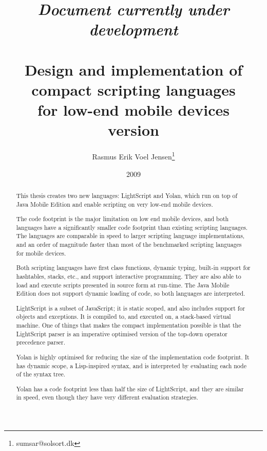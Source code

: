 \documentclass[11pt]{report}
\title{
\emph{Document currently under development} \\ ~ \\
Design and implementation of \\
compact scripting languages \\ 
for low-end mobile devices \\
{\scriptsize version }}
\author{
  Rasmus Erik Voel Jensen\footnote{
    sumsar@solsort.dk
  }
}
\date{2009}
\begin{document}
\maketitle
\begin{abstract}
This thesis creates two new languages: LightScript and Yolan, which run on top of Java Mobile Edition and enable scripting on very low-end mobile devices.

The code footprint is the major limitation on low end mobile devices, and both languages have a significantly smaller code footprint than existing scripting languages. 
The languages are comparable in speed to larger scripting language implementations,
and an order of magnitude faster than most of the benchmarked scripting languages for mobile devices.

Both scripting languages have first class functions, dynamic typing, built-in support for hashtables, stacks, etc., and support interactive programming. They are also able to load and execute scripts presented in source form at run-time. 
The Java Mobile Edition does not support dynamic loading of code, so both languages are interpreted.

LightScript is a subset of JavaScript; it is static scoped, and also includes support for objects and exceptions. It is compiled to, and executed on, a stack-based virtual machine. One of things that makes the compact implementation possible is that the LightScript parser is an imperative optimised version of the top-down operator precedence parser.

Yolan is highly optimised for reducing the size of the implementation code footprint. It has dynamic scope, a Lisp-inspired syntax, and is interpreted by evaluating each node of the syntax tree.

Yolan has a code footprint less than half the size of LightScript, and they are similar in speed, even though they have very different evaluation strategies.
\end{abstract}

\setcounter{tocdepth}{2}
\tableofcontents
\end{document}
